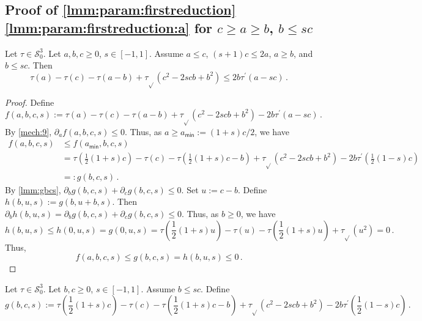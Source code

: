 \documentclass{article}
\newcommand{\lb}{\left(} %
\newcommand{\rb}{\right)} %
\newcommand{\br}[1]{\lb #1 \rb} %
\newcommand{\brOf}[1]{\!\br{#1}} %
\newcommand*{\mc}[1]{\mathcal{#1}}
\newcommand*{\ms}[1]{\mathsf{#1}}
\newcommand{\pr}{^\prime}
\newcommand{\equationFullstop}{\, .}
\newcommand{\eqfs}{\equationFullstop}
\newcommand{\tran}{\tau}
\newcommand{\trans}{\tran_{\!\sqrt{}}}
\newcommand{\dtran}{\tran\pr}
\newcommand{\setccod}[1]{\mc S_0^{#1}}
\begin{document}
\begin{appendix}
\subsection{Proof of \cref{lmm:param:firstreduction} \ref{lmm:param:firstreduction:a} for $c \geq a \geq b$, $b \leq sc$}\label{ssec:reduicGaGbLsc}
%
%
\begin{lemma}\label{lmm:param:reduicGaGbLsc}
	Let $\tran\in\setccod3$.
	Let $a,b,c\geq0$, $s\in[-1,1]$.
	Assume $a\leq c$, $(s+1)c\leq 2a$, $a\geq b$, and $b\leq sc$.
	Then
	\begin{equation*}
		\tran(a)-\tran(c)-\tran(a-b)+\trans(c^2-2scb+b^2) 
		\leq
		2 b \dtran(a - sc) 
		\eqfs
	\end{equation*}
\end{lemma}
%
\begin{proof}
	Define
	\begin{equation*}
		f(a,b,c,s) := \tran(a)-\tran(c)-\tran(a-b)+\trans(c^2-2scb+b^2) - 2 b \dtran(a - sc)\eqfs
	\end{equation*}
	By \cref{mech:9}, $\partial_a f(a,b,c,s) \leq 0$. Thus, as $a \geq  a_{\ms{min}} := (1+s)c/2$, we have 
	\begin{align*}
		f(a,b,c,s) 
		&\leq 
		f(a_{\ms{min}},b,c,s) 
		\\&= 
		\tran\brOf{\frac12(1+s)c} - \tran(c) - \tran\brOf{\frac12(1+s)c - b} + \trans(c^2-2scb+b^2) - 2b\dtran\brOf{\frac12(1-s)c}
		\\&=:
		g(b,c,s)
		\eqfs
	\end{align*}
	By \cref{lmm:gbcs}, $\partial_b g(b,c,s)  + \partial_c g(b,c,s) \leq 0$.
	Set $u := c - b$. Define $h(b, u, s) := g(b,u+b,s)$. Then $\partial_b h(b,u,s) = \partial_b g(b,c,s)  + \partial_c g(b,c,s) \leq 0$. Thus, as $b \geq 0$, we have 
	\begin{equation*}
		h(b, u, s) \leq h(0, u, s) =  g(0,u,s) = \tran\brOf{\frac12(1+s)u} - \tran(u) - \tran\brOf{\frac12(1+s)u} + \trans(u^2) = 0
		\eqfs
	\end{equation*}
	Thus,
	\begin{equation*}
		f(a,b,c,s) \leq g(b,c,s) = h(b, u, s) \leq 0
		\eqfs
	\end{equation*}
\end{proof}
%
%
%
\begin{lemma}\label{lmm:gbcs}
	Let $\tran\in\setccod3$.
	Let $b,c\geq0$, $s\in[-1,1]$.
	Assume $b\leq sc$.
	Define
	\begin{equation*}
		g(b,c,s) := \tran\brOf{\frac12(1+s)c} - \tran(c) - \tran\brOf{\frac12(1+s)c - b} + \trans(c^2-2scb+b^2) - 2b\dtran\brOf{\frac12(1-s)c}\eqfs

\end{equation*}
\end{lemma}
\end{appendix}
\end{document}
